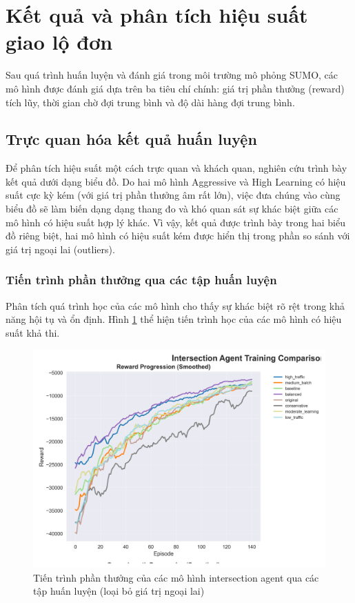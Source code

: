\section{Kết quả và phân tích hiệu suất giao lộ đơn}

Sau quá trình huấn luyện và đánh giá trong môi trường mô phỏng SUMO, các mô hình được đánh giá dựa trên ba tiêu chí chính: giá trị phần thưởng (reward) tích lũy, thời gian chờ đợi trung bình và độ dài hàng đợi trung bình.

\subsection{Trực quan hóa kết quả huấn luyện}

Để phân tích hiệu suất một cách trực quan và khách quan, nghiên cứu trình bày
kết quả dưới dạng biểu đồ. Do hai mô hình Aggressive và High Learning có hiệu suất cực kỳ kém (với giá trị phần thưởng âm rất lớn), việc đưa chúng vào cùng biểu đồ sẽ làm biến dạng dạng thang đo và khó quan sát sự khác biệt giữa các mô hình có hiệu suất hợp lý khác. Vì vậy, kết quả được trình bày trong hai biểu đồ riêng biệt, hai mô hình có hiệu suất kém được hiển thị trong phần so sánh với giá trị ngoại lai (outliers).

\subsubsection{Tiến trình phần thưởng qua các tập huấn luyện}
Phân tích quá trình học của các mô hình cho thấy sự khác biệt rõ rệt trong khả năng hội tụ và ổn định. Hình \ref{fig:intersection_filtered_reward_progress} thể hiện tiến trình học của các mô hình có hiệu suất khả thi.

\begin{figure}[!htp]
    \centering
    \includegraphics[width=\textwidth]{figures/individual_plots/intersection_filtered_reward_progress.png}
    \caption{Tiến trình phần thưởng của các mô hình intersection agent qua các tập huấn luyện (loại bỏ giá trị ngoại lai)}
    \label{fig:intersection_filtered_reward_progress}
\end{figure}


